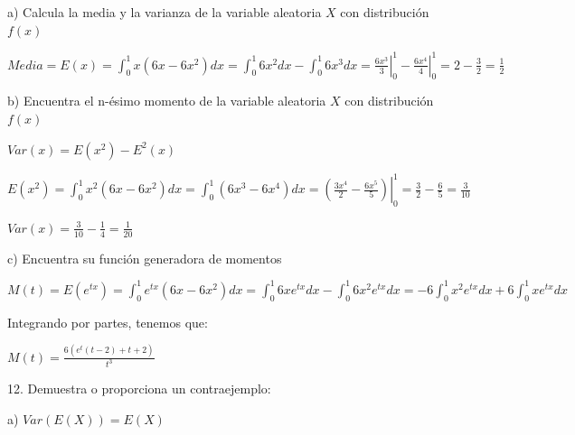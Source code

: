 \documentclass{article}
\begin{document}
        a) Calcula la media y la varianza de la variable aleatoria $X$ 
        con distribución $f(x)$\vspace{.1cm}

        \vspace{.1cm}

        $Media=E(x)=\displaystyle\int_{0}^{1}x(6x-6x^2)dx = 
        \int_{0}^{1}6x^2dx-\int_{0}^{1}6x^3dx = \left. \frac{6x^3}{3} \right |_{0}^{1}
         - \left. \frac{6x^4}{4} \right |_{0}^{1} = 2 - \frac{3}{2} = \frac{1}{2}$\vspace{.1cm}

        b) Encuentra el n-ésimo momento de la variable aleatoria $X$ 
        con distribución $f(x)$\vspace{.1cm}

        \vspace{.1cm}

        $Var(x) = E(x^2) - E^2(x)$\vspace{.1cm}

        $E(x^2) = \displaystyle\int_{0}^{1}x^2(6x-6x^2)dx = \int_{0}^{1}(6x^3-6x^4)dx = 
        \left .(\frac{3x^4}{2} - \frac{6x^5}{5})\right |_{0}^{1} 
        = \frac{3}{2} - \frac{6}{5} = \frac{3}{10}$
        \vspace{.1cm}

        $Var(x) = \frac{3}{10} - \frac{1}{4} = \frac{1}{20}$\vspace{.1cm}

        c) Encuentra su función generadora de momentos\vspace{.1cm}

        \vspace{.1cm}

        $M(t) = E(e^{tx}) = \int_{0}^{1}e^{tx}(6x-6x^2)dx 
        = \int_{0}^{1}6xe^{tx}dx - \int_{0}^{1}6x^2e^{tx}dx =
        -6\int_{0}^{1}x^2e^{tx}dx + 6\int_{0}^{1}xe^{tx}dx$
        
        Integrando por partes, tenemos que: \vspace{.1cm}

        $M(t) = \frac{6(e^t(t-2)+t+2)}{t^3}$\vspace{.3cm}

        \newpage

        12. Demuestra o proporciona un contraejemplo: \vspace{.1cm}

        a) $Var(E(X)) = E(X)$\vspace{.1cm}
\end{document}
